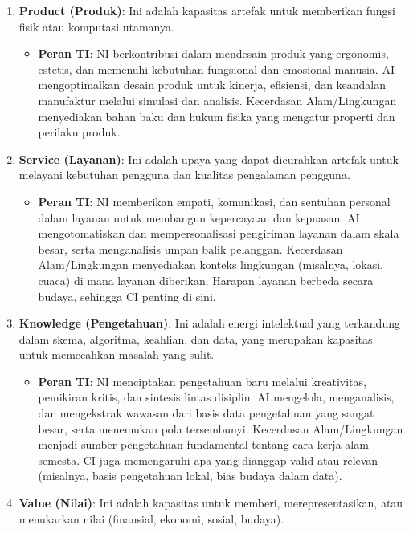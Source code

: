 \documentclass[
  letterpaper,
  DIV=11,
  numbers=noendperiod]{scrreprt}
\providecommand{\tightlist}{%
  \setlength{\itemsep}{0pt}\setlength{\parskip}{0pt}}
\begin{document}
\begin{enumerate}
\def\labelenumi{\arabic{enumi}.}
\tightlist
\item
  \textbf{Product (Produk)}: Ini adalah kapasitas artefak untuk
  memberikan fungsi fisik atau komputasi utamanya.

  \begin{itemize}
  \tightlist
  \item
    \textbf{Peran TI}: NI berkontribusi dalam mendesain produk yang
    ergonomis, estetis, dan memenuhi kebutuhan fungsional dan emosional
    manusia. AI mengoptimalkan desain produk untuk kinerja, efisiensi,
    dan keandalan manufaktur melalui simulasi dan analisis. Kecerdasan
    Alam/Lingkungan menyediakan bahan baku dan hukum fisika yang
    mengatur properti dan perilaku produk.
  \end{itemize}
\item
  \textbf{Service (Layanan)}: Ini adalah upaya yang dapat dicurahkan
  artefak untuk melayani kebutuhan pengguna dan kualitas pengalaman
  pengguna.

  \begin{itemize}
  \tightlist
  \item
    \textbf{Peran TI}: NI memberikan empati, komunikasi, dan sentuhan
    personal dalam layanan untuk membangun kepercayaan dan kepuasan. AI
    mengotomatiskan dan mempersonalisasi pengiriman layanan dalam skala
    besar, serta menganalisis umpan balik pelanggan. Kecerdasan
    Alam/Lingkungan menyediakan konteks lingkungan (misalnya, lokasi,
    cuaca) di mana layanan diberikan. Harapan layanan berbeda secara
    budaya, sehingga CI penting di sini.
  \end{itemize}
\item
  \textbf{Knowledge (Pengetahuan)}: Ini adalah energi intelektual yang
  terkandung dalam skema, algoritma, keahlian, dan data, yang merupakan
  kapasitas untuk memecahkan masalah yang sulit.

  \begin{itemize}
  \tightlist
  \item
    \textbf{Peran TI}: NI menciptakan pengetahuan baru melalui
    kreativitas, pemikiran kritis, dan sintesis lintas disiplin. AI
    mengelola, menganalisis, dan mengekstrak wawasan dari basis data
    pengetahuan yang sangat besar, serta menemukan pola tersembunyi.
    Kecerdasan Alam/Lingkungan menjadi sumber pengetahuan fundamental
    tentang cara kerja alam semesta. CI juga memengaruhi apa yang
    dianggap valid atau relevan (misalnya, basis pengetahuan lokal, bias
    budaya dalam data).
  \end{itemize}
\item
  \textbf{Value (Nilai)}: Ini adalah kapasitas untuk memberi,
  merepresentasikan, atau menukarkan nilai (finansial, ekonomi, sosial,
  budaya).


\end{enumerate}
\end{document}

